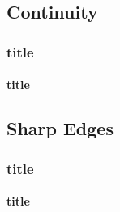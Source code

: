 \subsection{Continuity}
\begin{frame}
	\frametitle{title}
    \framesubtitle{title}
\end{frame}

\subsection{Sharp Edges}
\begin{frame}
	\frametitle{title}
    \framesubtitle{title}
\end{frame}